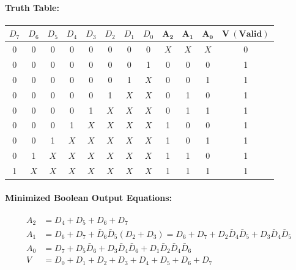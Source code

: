 \documentclass[11pt,a4paper,oneside]{book}
\begin{document}
\paragraph{Truth Table:}
\begin{center}
\small
\begin{tabular}{|cccccccc||ccc|c|}
\hline
$D_7$ & $D_6$ & $D_5$ & $D_4$ & $D_3$ & $D_2$ & $D_1$ & $D_0$ & $\mathbf{A_2}$ & $\mathbf{A_1}$ & $\mathbf{A_0}$ & $\mathbf{V\ (Valid)}$ \\ \hline
0 & 0 & 0 & 0 & 0 & 0 & 0 & 0 & $X$ & $X$ & $X$ & 0 \\ \hline
0 & 0 & 0 & 0 & 0 & 0 & 0 & 1 & 0 & 0 & 0 & 1 \\ \hline
0 & 0 & 0 & 0 & 0 & 0 & 1 & $X$ & 0 & 0 & 1 & 1 \\ \hline
0 & 0 & 0 & 0 & 0 & 1 & $X$ & $X$ & 0 & 1 & 0 & 1 \\ \hline
0 & 0 & 0 & 0 & 1 & $X$ & $X$ & $X$ & 0 & 1 & 1 & 1 \\ \hline
0 & 0 & 0 & 1 & $X$ & $X$ & $X$ & $X$ & 1 & 0 & 0 & 1 \\ \hline
0 & 0 & 1 & $X$ & $X$ & $X$ & $X$ & $X$ & 1 & 0 & 1 & 1 \\ \hline
0 & 1 & $X$ & $X$ & $X$ & $X$ & $X$ & $X$ & 1 & 1 & 0 & 1 \\ \hline
1 & $X$ & $X$ & $X$ & $X$ & $X$ & $X$ & $X$ & 1 & 1 & 1 & 1 \\ \hline
\end{tabular}
\end{center}

\paragraph{Minimized Boolean Output Equations:}
\begin{align*}
A_2 &= D_4 + D_5 + D_6 + D_7 \\
A_1 &= D_6 + D_7 + \bar{D}_6 \bar{D}_5 (D_2 + D_3) = D_6 + D_7 + D_2 \bar{D}_4 \bar{D}_5 + D_3 \bar{D}_4 \bar{D}_5 \\
A_0 &= D_7 + D_5 \bar{D}_6 + D_3 \bar{D}_4 \bar{D}_6 + D_1 \bar{D}_2 \bar{D}_4 \bar{D}_6 \\
V &= D_0 + D_1 + D_2 + D_3 + D_4 + D_5 + D_6 + D_7
\end{align*}
\end{document}
